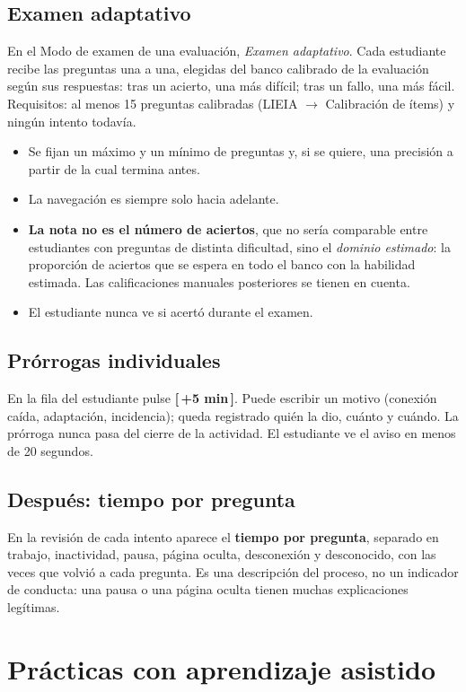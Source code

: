 \documentclass[11pt,a4paper,oneside]{book}
\newcommand{\boton}[1]{\textsf{\textbf{[\,#1\,]}}}
\begin{document}
\section{Examen adaptativo}
En el Modo de examen de una evaluación, \emph{Examen adaptativo}. Cada estudiante recibe las preguntas una a una,
elegidas del banco calibrado de la evaluación según sus respuestas: tras un acierto, una más difícil; tras un fallo, una
más fácil. Requisitos: al menos 15 preguntas calibradas (LIEIA $\rightarrow$ Calibración de ítems) y ningún intento todavía.
\begin{itemize}
  \item Se fijan un máximo y un mínimo de preguntas y, si se quiere, una precisión a partir de la cual termina antes.
  \item La navegación es siempre solo hacia adelante.
  \item \textbf{La nota no es el número de aciertos}, que no sería comparable entre estudiantes con preguntas de distinta
        dificultad, sino el \emph{dominio estimado}: la proporción de aciertos que se espera en todo el banco con la
        habilidad estimada. Las calificaciones manuales posteriores se tienen en cuenta.
  \item El estudiante nunca ve si acertó durante el examen.
\end{itemize}

\section{Prórrogas individuales}
En la fila del estudiante pulse \boton{+5 min}. Puede escribir un motivo (conexión caída, adaptación, incidencia); queda
registrado quién la dio, cuánto y cuándo. La prórroga nunca pasa del cierre de la actividad. El estudiante ve el aviso
en menos de 20 segundos.

\section{Después: tiempo por pregunta}
En la revisión de cada intento aparece el \textbf{tiempo por pregunta}, separado en trabajo, inactividad, pausa,
página oculta, desconexión y desconocido, con las veces que volvió a cada pregunta. Es una descripción del proceso,
no un indicador de conducta: una pausa o una página oculta tienen muchas explicaciones legítimas.

\chapter{Prácticas con aprendizaje asistido}
\end{document}
